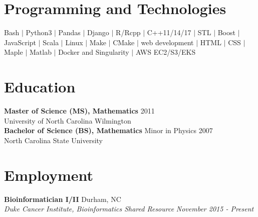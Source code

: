 \documentclass[10pt]{article}
\begin{document}

\section*{Programming and Technologies}

Bash $|$ Python3 $|$ Pandas $|$ Django $|$ R/Rcpp $|$ C++11/14/17 $|$ STL $|$ Boost $|$ JavaScript $|$ Scala $|$ Linux $|$ Make $|$ CMake $|$ web development $|$ HTML $|$ CSS $|$ Maple $|$ Matlab $|$ Docker and Singularity $|$ AWS EC2/S3/EKS


\section*{Education}

{\bf Master of Science (MS), Mathematics} \hfill 2011\\
University of North Carolina Wilmington
\vspace{5pt}\\
\noindent
{\bf Bachelor of Science (BS), Mathematics} Minor in Physics \hfill 2007\\
North Carolina State University


\section*{Employment}

\noindent
{\bf Bioinformatician I/II} \hfill Durham, NC\\
{\it Duke Cancer Institute, Bioinformatics Shared Resource} \hfill {\it November 2015 - Present}
\end{document}
